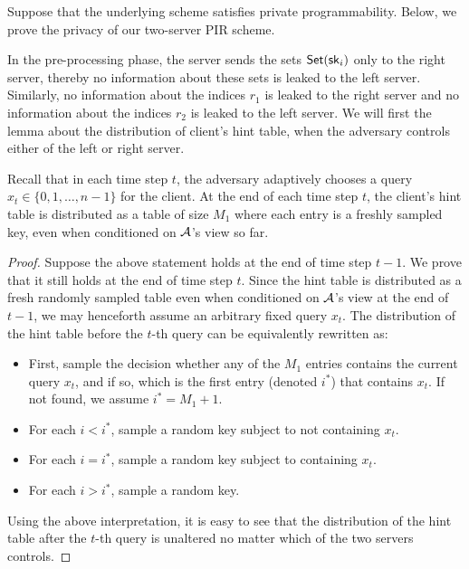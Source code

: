 Suppose that the underlying \ppps scheme satisfies
private programmability.
Below, we prove the privacy of our two-server PIR scheme.

In the pre-processing 
phase, the server sends the sets $\mathsf{Set}(\mathsf{sk}_i)$ only to the right server, thereby no information about these sets is leaked to the left server. Similarly, no information about the indices $r_1$ is leaked to the right server and no information about the indices $r_2$ is leaked to the left server.
We will first the lemma about the distribution of client's hint table, when the adversary controls either of the left or right server.
\begin{lemma}
 Recall that in each time step $t$, the adversary \algA 
adaptively chooses a query $x_t \in \{0, 1, \ldots, n-1\}$ for the client.
At the end of each time step $t$, 
the client's hint table  
is distributed 
as a table of size $M_1$
where each entry is a freshly sampled \ppps key, even when
conditioned on $\mathcal{A}$'s view so far.  
\label{lem:2server-hintfresh}
\end{lemma}
\begin{proof}
Suppose the above statement holds at the end of time step $t-1$.
We prove that it still holds 
at the end of time step $t$.
Since the hint table is distributed as a fresh randomly sampled
table even when conditioned on $\mathcal{A}$'s view
at the end of $t-1$, we may henceforth assume
an arbitrary fixed query $x_t$.
The distribution of the hint table 
before the $t$-th query can be equivalently rewritten as:
\begin{itemize}[leftmargin=5mm]
\item First, 
sample the decision whether any 
of the $M_1$ entries contains the current query $x_t$,
and if so, which is the first entry (denoted $i^*$) 
that contains $x_t$. 
If not found, we assume $i^* = M_1 + 1$. 
\item 
For each $i < i^*$, sample a random \ppps
key subject to not containing $x_t$.
\item 
For each $i = i^*$, sample a random \ppps
key subject to containing $x_t$.
\item 
For each $i > i^*$, sample a random \ppps key.
\end{itemize}

Using the above interpretation, it is easy to see 
that the distribution of the hint table 
after the $t$-th query is unaltered 
no matter which of the two servers \algA controls.
\end{proof}


